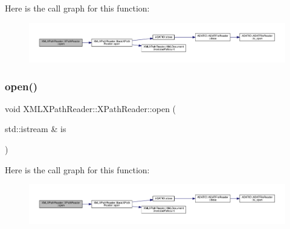Here is the call graph for this function\+:
\nopagebreak
\begin{figure}[H]
\begin{center}
\leavevmode
\includegraphics[width=350pt]{d3/d5a/classXMLXPathReader_1_1XPathReader_aa6e237582bcd20389d60cb29a879890c_cgraph}
\end{center}
\end{figure}
\mbox{\label{classXMLXPathReader_1_1XPathReader_aa9a57010ee8e71ac43da4388d622fe32}} 
\subsubsection{\texorpdfstring{open()}{open()}\hspace{0.1cm}{\footnotesize\ttfamily [4/9]}}
{\footnotesize\ttfamily void X\+M\+L\+X\+Path\+Reader\+::\+X\+Path\+Reader\+::open (\begin{DoxyParamCaption}\item[{std\+::istream \&}]{is }\end{DoxyParamCaption})\hspace{0.3cm}{\ttfamily [inline]}}

Here is the call graph for this function\+:
\nopagebreak
\begin{figure}[H]
\begin{center}
\leavevmode
\includegraphics[width=350pt]{d3/d5a/classXMLXPathReader_1_1XPathReader_aa9a57010ee8e71ac43da4388d622fe32_cgraph}
\end{center}
\end{figure}
\mbox{\label{classXMLXPathReader_1_1XPathReader_aa9a57010ee8e71ac43da4388d622fe32}} 
